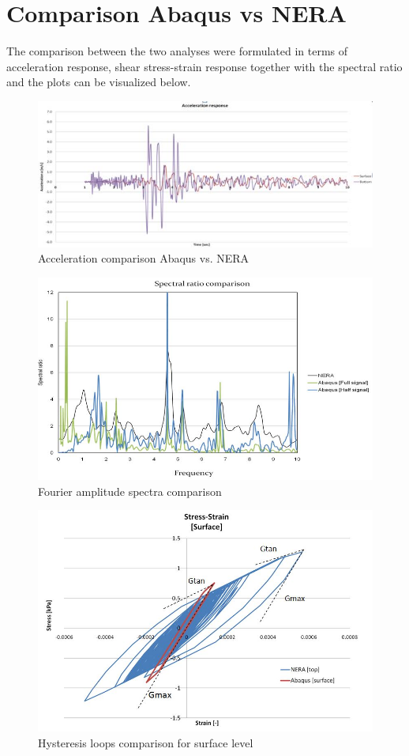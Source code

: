 \documentclass[10pt,a4paper]{report}
\begin{document}
\section{Comparison Abaqus vs NERA}
The comparison between the two analyses were formulated in terms of acceleration response, shear stress-strain response together with the spectral ratio and the plots can be visualized below.

\begin{figure}[h!]
	\centering
	\includegraphics[width=0.7\linewidth]{"acc_response2"}
	\caption{Acceleration comparison Abaqus vs. NERA}
	\label{comp1}
\end{figure}

\begin{figure}[h!]
	\centering
	\includegraphics[width=0.7\linewidth]{"spectral2"}
	\caption{Fourier amplitude spectra comparison}
	\label{fourier2}
\end{figure}

\begin{figure}[h!]
	\centering
	\includegraphics[width=0.7\linewidth]{"tau_gamma1"}
	\caption{Hysteresis loops comparison for surface level}
	\label{tau_gamma1}
\end{figure}
\end{document}
